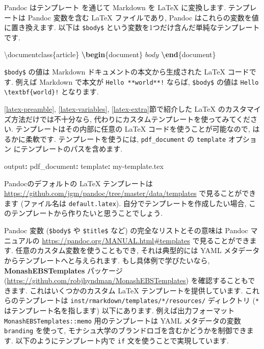 \documentclass[
  11pt,
  lualatex,ja=standard,jafont=noto]{bxjsreport}
\newenvironment{Shaded}{\begin{snugshade}}{\end{snugshade}}
\newcommand{\AttributeTok}[1]{\textcolor[rgb]{0.77,0.63,0.00}{#1}}
\newcommand{\BuiltInTok}[1]{#1}
\newcommand{\ExtensionTok}[1]{#1}
\newcommand{\FunctionTok}[1]{\textcolor[rgb]{0.00,0.00,0.00}{#1}}
\newcommand{\KeywordTok}[1]{\textcolor[rgb]{0.13,0.29,0.53}{\textbf{#1}}}
\newcommand{\NormalTok}[1]{#1}
\newcommand{\SpecialStringTok}[1]{\textcolor[rgb]{0.31,0.60,0.02}{#1}}
\begin{document}
Pandoc はテンプレート を通じて Markdown を LaTeX に変換します. テンプレートは Pandoc 変数を含む LaTeX ファイルであり, Pandoc はこれらの変数を値に置き換えます. 以下は \texttt{\$body\$} という変数を1つだけ含んだ単純なテンプレートです.

\begin{Shaded}
\begin{Highlighting}[]
\BuiltInTok{\textbackslash{}documentclass}\NormalTok{\{}\ExtensionTok{article}\NormalTok{\}}
\KeywordTok{\textbackslash{}begin}\NormalTok{\{}\ExtensionTok{document}\NormalTok{\}}
\SpecialStringTok{$body$}
\KeywordTok{\textbackslash{}end}\NormalTok{\{}\ExtensionTok{document}\NormalTok{\}}
\end{Highlighting}
\end{Shaded}

\texttt{\$body\$} の値は Markdown ドキュメントの本文から生成された LaTeX コードです. 例えば Markdown で本文が \texttt{Hello **world**!} ならば, \texttt{\$body\$} の値は \texttt{Hello \textbackslash{}textbf\{world\}!} となります.

\ref{latex-preamble}, \ref{latex-variables}, \ref{latex-extra}節で紹介した LaTeX のカスタマイズ方法だけでは不十分なら, 代わりにカスタムテンプレートを使ってみてください. テンプレートはその内部に任意の LaTeX コードを使うことが可能なので, はるかに柔軟です. テンプレートを使うには, \texttt{pdf\_document} の \texttt{template} オプション にテンプレートのパスを含めます.

\begin{Shaded}
\begin{Highlighting}[]
\FunctionTok{output}\KeywordTok{:}
\AttributeTok{  }\FunctionTok{pdf\_document}\KeywordTok{:}
\AttributeTok{    }\FunctionTok{template}\KeywordTok{:}\AttributeTok{ my{-}template.tex}
\end{Highlighting}
\end{Shaded}

Pandocのデフォルトの LaTeX テンプレートは \url{https://github.com/jgm/pandoc/tree/master/data/templates} で見ることができます (ファイル名は \texttt{default.latex}). 自分でテンプレートを作成したい場合, このテンプレートから作りたいと思うことでしょう.

Pandoc 変数 (\texttt{\$body\$} や \texttt{\$title\$} など) の完全なリストとその意味は Pandoc マニュアルの \url{https://pandoc.org/MANUAL.html\#templates} で見ることができます. 任意のカスタム変数を使うこともでき, それは典型的には YAML メタデータからテンプレートへと与えられます. もし具体例で学びたいなら, \textbf{MonashEBSTemplates} パッケージ (\url{https://github.com/robjhyndman/MonashEBSTemplates}) を確認することもできます. これはいくつかのカスタム LaTeX テンプレートを提供しています. これらのテンプレートは \texttt{inst/rmarkdown/templates/*/resources/} ディレクトリ (\texttt{*} はテンプレート名を指します) 以下にあります. 例えば出力フォーマット \texttt{MonashEBSTemplates::memo} 用のテンプレートは YAML メタデータの変数 \texttt{branding} を使って, モナシュ大学のブランドロゴを含むかどうかを制御できます. 以下のようにテンプレート内で \texttt{if} 文を使うことで実現しています.
\end{document}
